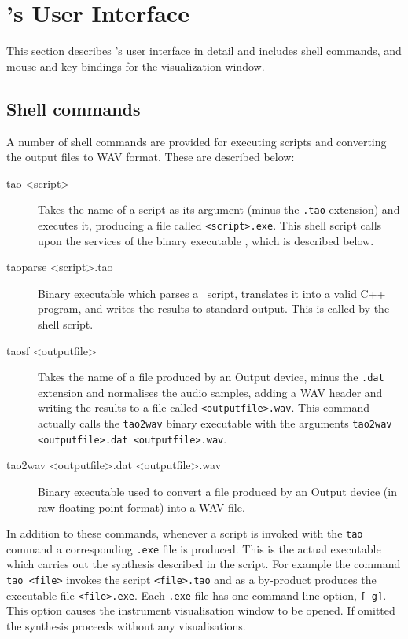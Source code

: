 \chapter{\tao's User Interface}

This section describes \tao's user interface in detail and includes
shell commands, and mouse and key bindings for the visualization
window.

\section{Shell commands}
A number of shell commands
are provided for executing scripts and converting
the output files to WAV format. These are described below:

\renewcommand{\descriptionlabel}[1]%
	{\hspace{\labelsep}\texttt{#1}}

\begin{description}
\item[tao <script>]
Takes the name of a script as its argument (minus the \verb|.tao|
extension) and executes it, producing a file called \verb|<script>.exe|.
This shell script calls upon the services of the binary executable
, which is described below.

\item[taoparse <script>.tao]
Binary executable which parses a \tao\ script, translates it into a
valid C++ program, and writes the results to standard output. This is
called by the  shell script.

\item[taosf <outputfile>]
Takes the name of a file produced by an Output device, minus the
\verb|.dat| extension and normalises the audio samples, adding
a WAV header and writing the results to a file called \verb|<outputfile>.wav|.
This command actually calls the \verb|tao2wav| binary executable with
the arguments \verb|tao2wav <outputfile>.dat <outputfile>.wav|.

\item[tao2wav <outputfile>.dat <outputfile>.wav]
Binary executable used to convert a file produced by an Output device
(in raw floating point format) into a WAV file.
\end{description}

In addition to these commands, whenever a script is invoked with the
\verb|tao| command a corresponding \verb|.exe| file is produced. This
is the actual executable which carries out the synthesis described in
the script. For example the command \verb|tao <file>| invokes the script
\verb|<file>.tao| and as a by-product produces the executable file
\verb|<file>.exe|. Each \verb|.exe| file has one command line option,
\verb|[-g]|. This option causes the instrument visualisation window
to be opened. If omitted the synthesis proceeds without any visualisations.

